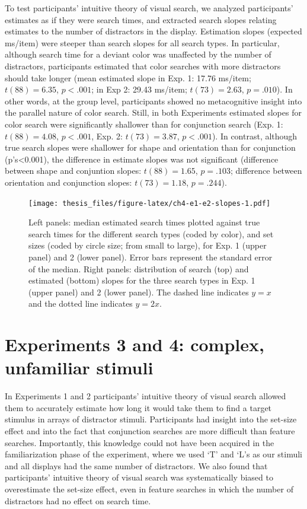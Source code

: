 \documentclass[12pt,twoside]{reedthesis}
\begin{document}
To test participants' intuitive theory of visual search, we analyzed participants' estimates as if they were search times, and extracted search slopes relating estimates to the number of distractors in the display. Estimation slopes (expected ms/item) were steeper than search slopes for all search types. In particular, although search time for a deviant color was unaffected by the number of distractors, participants estimated that color searches with more distractors should take longer (mean estimated slope in Exp. 1: 17.76 ms/item; \(t(88) = 6.35\), \(p < .001\); in Exp 2: 29.43 ms/item; \(t(73) = 2.63\), \(p = .010\)). In other words, at the group level, participants showed no metacognitive insight into the parallel nature of color search. Still, in both Experiments estimated slopes for color search were significantly shallower than for conjunction search (Exp. 1: \(t(88) = 4.08\), \(p < .001\), Exp. 2: \(t(73) = 3.87\), \(p < .001\)). In contrast, although true search slopes were shallower for shape and orientation than for conjunction (p's\textless0.001), the difference in estimate slopes was not significant (difference between shape and conjuntion slopes: \(t(88) = 1.65\), \(p = .103\); difference between orientation and conjunction slopes: \(t(73) = 1.18\), \(p = .244\)).
\begin{figure}
\centering
\texttt{[image: thesis\_files/figure-latex/ch4-e1-e2-slopes-1.pdf]}
\caption{\label{fig:ch4-e1-e2-slopes}Left panels: median estimated search times plotted against true search times for the different search types (coded by color), and set sizes (coded by circle size; from small to large), for Exp. 1 (upper panel) and 2 (lower panel). Error bars represent the standard error of the median. Right panels: distribution of search (top) and estimated (bottom) slopes for the three search types in Exp. 1 (upper panel) and 2 (lower panel). The dashed line indicates \(y=x\) and the dotted line indicates \(y=2x\).}
\end{figure}
\hypertarget{experiments-3-and-4-complex-unfamiliar-stimuli}{%
\section{Experiments 3 and 4: complex, unfamiliar stimuli}\label{experiments-3-and-4-complex-unfamiliar-stimuli}}

In Experiments 1 and 2 participants' intuitive theory of visual search allowed them to accurately estimate how long it would take them to find a target stimulus in arrays of distractor stimuli. Participants had insight into the set-size effect and into the fact that conjunction searches are more difficult than feature searches. Importantly, this knowledge could not have been acquired in the familiarization phase of the experiment, where we used `T' and `L's as our stimuli and all displays had the same number of distractors. We also found that participants' intuitive theory of visual search was systematically biased to overestimate the set-size effect, even in feature searches in which the number of distractors had no effect on search time.
\end{document}

